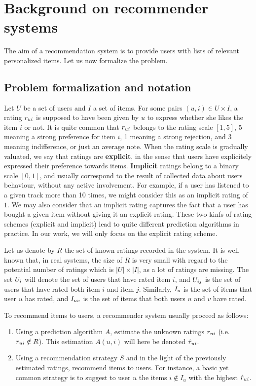 \section{Background on recommender systems}
\label{sec:background_RS}

The aim of a recommendation system is to provide users with lists of relevant
personalized items.  Let us now formalize the problem.

\subsection{Problem formalization and notation}
Let $U$ be a set of users and $I$ a set of items. For some pairs $(u,i) \in U
\times I$, a rating  $r_{ui}$ is supposed to have been given by $u$ to express
whether she likes the item $i$ or not.  It is quite common that  $r_{ui}$ belongs
to the rating scale $[1, 5]$, 5 meaning a strong preference for item $i$, 1
meaning a strong rejection, and 3 meaning indifference, or just an average
note. When the rating scale is gradually valuated, we say that ratings are
\textbf{explicit}, in the sense that users have explicitely expressed their
preference towards items. \textbf{Implicit} ratings belong to a binary scale $[0,
1]$, and usually correspond to the result of collected data about users
behaviour, without any active involvement. For example, if a user has listened to a given track more than 10
times, we might consider this as an implicit rating of $1$. We may also
consider that an implicit rating captures the fact that a user has bought a
given item without giving it an explicit rating. These two kinfs of rating
schemes (explicit and implicit) lead to quite different prediction algorithms
in practice. In our work, we will only focus on the explicit rating
scheme.

Let us denote by $R$ the set of known ratings recorded in the system. It is
well known that, in real systems, the size of $R$ is very small with regard to
the potential number of ratings which is $|U| \times |I|$, as a lot of ratings
are missing. The set $U_i$ will denote the set of users that have rated item
$i$, and $U_{ij}$ is the set of users that have rated both item $i$ and item $j$.
Similarly, $I_u$ is the set of items that user $u$ has rated, and $I_{uv}$ is the
set of items that both users $u$ and $v$ have rated.

To recommend items to users, a recommender system usually proceed as follows:
\begin{enumerate}
\item Using a prediction algorithm $A$, estimate the unknown ratings $r_{ui}$
  (i.e. $r_{ui} \notin R$). This estimation $A(u, i)$ will here be denoted
    $\hat{r}_{ui}$.
\item Using a recommendation strategy $S$ and in the light of the previously
  estimated ratings, recommend items to users. For instance, a basic yet common
    strategy is to suggest to user $u$ the items $i \notin I_u$ with the
    highest $\hat{r}_{ui}$.
\end{enumerate}

